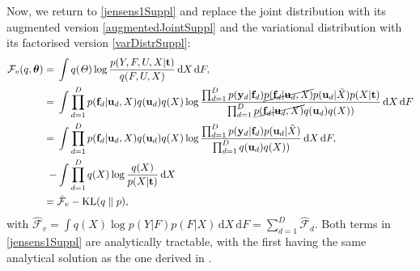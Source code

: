 %
Now, we return to \ref{jensens1Suppl} and replace the joint distribution with its augmented version \eqref{augmentedJointSuppl} and the variational distribution with its factorised version \eqref{varDistrSuppl}:
\begin{align}
\mathcal{F}_v(q, \boldsymbol \theta) = {}& \int q(\mathit{\Theta}) \log 
		\frac{ p(Y,F, U,X | \mathbf{t})}
			 {q(F, U,X)}  \, \mathrm{d} X \,\mathrm{d}F,
 	    \nonumber \\
= {}& \int \prod_{d=1}^D p(\mathbf{f}_d | \mathbf{u}_d, X )q(\mathbf{u}_d) q(X) 
	    \log  \frac{\prod_{d=1}^D p(\mathbf{y}_d | \mathbf{f}_d) \cancel{p(\mathbf{f}_d | \mathbf{u}_d, \mathit{X})}
						p(\mathbf{u}_d | \tilde{X})  p(X | \mathbf{t})}
 	      		   {\prod_{d=1}^D \cancel{p(\mathbf{f}_d | \mathbf{u}_d, X )}q(\mathbf{u}_d) q(X))}   \, \mathrm{d} X \,\mathrm{d}F \nonumber \\
= {}& \int \prod_{d=1}^D p(\mathbf{f}_d | \mathbf{u}_d, X )q(\mathbf{u}_d) q(X) 
		\log  \frac{\prod_{d=1}^D p(\mathbf{y}_d | \mathbf{f}_d) p(\mathbf{u}_d | \tilde{X})}
				   {\prod_{d=1}^D q(\mathbf{u}_d) q(X))}   \, \mathrm{d} X \,\mathrm{d}F, \nonumber \\
- {}& \int \prod_{d=1}^D  q(X)   \log \frac{q(X)}{p(X | \mathbf{t})}   \, \mathrm{d} X \nonumber \\
= {}& \hat{\mathcal{F}}_v - \text{KL}(q \parallel p), \label{jensens1Suppl}
\end{align}
%
with $\hat{\mathcal{F}}_v =\int q(X) \log p( Y | F ) p( F | X) \,
\mathrm{d} X \,\mathrm{d}F = \sum_{d=1}^D \hat{\mathcal{F}}_d$. Both terms in \eqref{jensens1Suppl} are analytically tractable, with the first having the same analytical solution as the one derived in \cite{BayesianGPLVM}.


